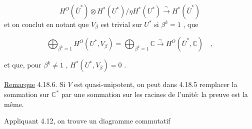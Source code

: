 \begin{equation*}
H^O(\overline{U}^*) \otimes H^*(U^*)/\eta H^*(U^*) \xrightarrow{\;\sim\;} H^*(\overline{U}^*)
\end{equation*}
et on conclut en notant que $V_\beta$ est trivial sur $U^*$ si $\beta^k = 1$ , que

\begin{equation*}
\bigoplus_{\beta^k=1} H^O(U^*, V_\beta) = \bigoplus_{\beta^k=1} \mathbb{C} \xrightarrow{\;\sim\;} H^O(\overline{U}^*, \mathbb{C}) \quad ,
\end{equation*}

et que, pour $\beta^k \neq 1$ , $H^*(U^*, V_\beta) = 0$ .

\underline{Remarque} 4.18.6. Si $V$ est quasi-unipotent, on peut dans 4.18.5 remplacer la sommation sur $\mathbb{C}^*$ par une sommation sur les racines de l'unité: la preuve est la même.

Appliquant 4.12, on trouve un diagramme commutatif

